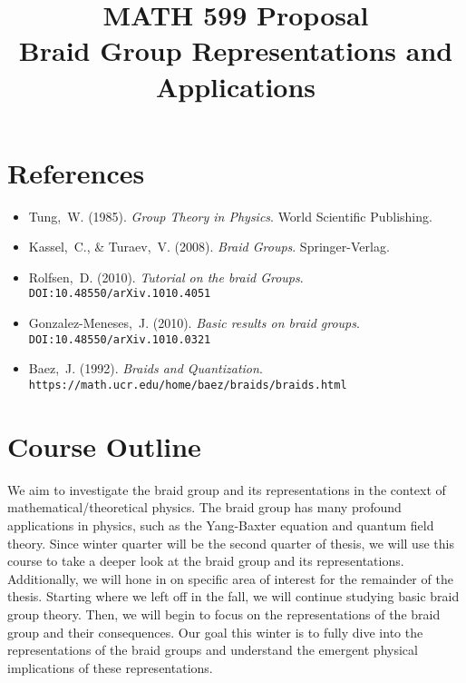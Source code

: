 \documentclass[oneside]{memoir}
\title{MATH 599 Proposal\\[0.5em]
	Braid Group Representations and Applications\\	 %
}
\date{\vspace{-5em}}
\begin{document}
\maketitle

%
%

\section{References}
\begin{itemize}
    \item Tung,~W. (1985). \textit{Group Theory in Physics}. World Scientific Publishing.
    \item Kassel,~C., \& Turaev,~V. (2008). \textit{Braid Groups}. Springer-Verlag.
    \item Rolfsen,~D. (2010). \textit{Tutorial on the braid Groups}. \texttt{DOI:\@10.48550/arXiv.1010.4051}
    \item Gonzalez-Meneses,~J. (2010). \textit{Basic results on braid groups}. \texttt{DOI:\@10.48550/arXiv.1010.0321}
    \item Baez,~J. (1992). \textit{Braids and Quantization}. \texttt{https://math.ucr.edu/home/baez/braids/braids.html}
\end{itemize}

\section{Course Outline}

We aim to investigate the braid group and its representations in the context of mathematical/theoretical physics. The braid group has many profound applications in physics, such as the Yang-Baxter equation and quantum field theory. Since winter quarter will be the second quarter of thesis, we will use this course to take a deeper look at the braid group and its representations. Additionally, we will hone in on specific area of interest for the remainder of the thesis.  Starting where we left off in the fall, we will continue studying basic braid group theory.  Then, we will begin to focus on the representations of the braid group and their consequences.  Our goal this winter is to fully dive into the representations of the braid groups and understand the emergent physical implications of these representations.
\end{document}
